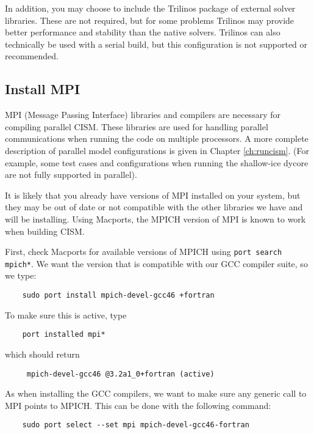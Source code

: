In addition, you may choose to include the Trilinos package of external solver libraries.  
These are not required, but for some problems Trilinos may provide better
performance and stability than the native solvers.  Trilinos can also technically be 
used with a serial build, but this configuration is not supported or recommended.

\subsection{Install MPI}
MPI (Message Passing Interface) libraries and compilers are necessary for compiling parallel CISM.  
These libraries are used for handling parallel communications when running the 
code on multiple processors. A more complete description of parallel 
model configurations is given in Chapter \ref{ch:runcism}. 
(For example, some test cases and configurations when running the shallow-ice 
dycore are not fully supported in parallel). 

\begin{mdframed}[style=mac] %
It is likely that you already have versions of MPI installed on your system, 
but they may be out of date or not compatible with the other libraries we have 
and will be installing. Using Macports, the MPICH version of MPI is known 
to work when building CISM.

First, check Macports for available versions of MPICH using \texttt{port search mpich*}. We want 
the version that is compatible with our GCC compiler suite, so we type: 

\begin{verbatim}
	sudo port install mpich-devel-gcc46 +fortran
\end{verbatim}

\noindent
To make sure this is active, type 
\begin{verbatim}
	port installed mpi*
\end{verbatim}

\noindent
which should return

\begin{verbatim}
     mpich-devel-gcc46 @3.2a1_0+fortran (active)
\end{verbatim}

\noindent
As when installing the GCC compilers, we want to make sure any generic call to MPI points to MPICH. This 
can be done with the following command:

\begin{verbatim}
	sudo port select --set mpi mpich-devel-gcc46-fortran
\end{verbatim}

\end{mdframed}              %



